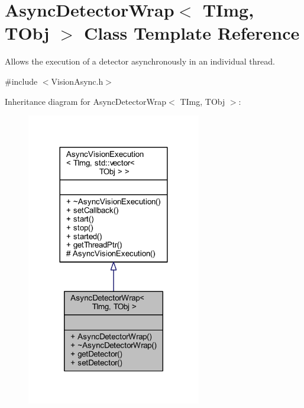 \hypertarget{class_vision_core_1_1_async_1_1_async_detector_wrap}{}\section{Async\+Detector\+Wrap$<$ T\+Img, T\+Obj $>$ Class Template Reference}
\label{class_vision_core_1_1_async_1_1_async_detector_wrap}


Allows the execution of a detector asynchronously in an individual thread.  




{\ttfamily \#include $<$Vision\+Async.\+h$>$}



Inheritance diagram for Async\+Detector\+Wrap$<$ T\+Img, T\+Obj $>$\+:
\nopagebreak
\begin{figure}[H]
\begin{center}
\leavevmode
\includegraphics[width=216pt]{class_vision_core_1_1_async_1_1_async_detector_wrap__inherit__graph}
\end{center}
\end{figure}


